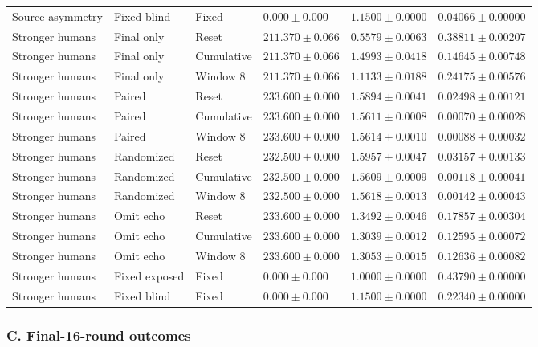 \begin{longtable}{@{}llllll@{}}
Source asymmetry & Fixed blind & Fixed & $0.000 \pm 0.000$ & $1.1500 \pm 0.0000$ & $0.04066 \pm 0.00000$ \\
Stronger humans & Final only & Reset & $211.370 \pm 0.066$ & $0.5579 \pm 0.0063$ & $0.38811 \pm 0.00207$ \\
Stronger humans & Final only & Cumulative & $211.370 \pm 0.066$ & $1.4993 \pm 0.0418$ & $0.14645 \pm 0.00748$ \\
Stronger humans & Final only & Window 8 & $211.370 \pm 0.066$ & $1.1133 \pm 0.0188$ & $0.24175 \pm 0.00576$ \\
Stronger humans & Paired & Reset & $233.600 \pm 0.000$ & $1.5894 \pm 0.0041$ & $0.02498 \pm 0.00121$ \\
Stronger humans & Paired & Cumulative & $233.600 \pm 0.000$ & $1.5611 \pm 0.0008$ & $0.00070 \pm 0.00028$ \\
Stronger humans & Paired & Window 8 & $233.600 \pm 0.000$ & $1.5614 \pm 0.0010$ & $0.00088 \pm 0.00032$ \\
Stronger humans & Randomized & Reset & $232.500 \pm 0.000$ & $1.5957 \pm 0.0047$ & $0.03157 \pm 0.00133$ \\
Stronger humans & Randomized & Cumulative & $232.500 \pm 0.000$ & $1.5609 \pm 0.0009$ & $0.00118 \pm 0.00041$ \\
Stronger humans & Randomized & Window 8 & $232.500 \pm 0.000$ & $1.5618 \pm 0.0013$ & $0.00142 \pm 0.00043$ \\
Stronger humans & Omit echo & Reset & $233.600 \pm 0.000$ & $1.3492 \pm 0.0046$ & $0.17857 \pm 0.00304$ \\
Stronger humans & Omit echo & Cumulative & $233.600 \pm 0.000$ & $1.3039 \pm 0.0012$ & $0.12595 \pm 0.00072$ \\
Stronger humans & Omit echo & Window 8 & $233.600 \pm 0.000$ & $1.3053 \pm 0.0015$ & $0.12636 \pm 0.00082$ \\
Stronger humans & Fixed exposed & Fixed & $0.000 \pm 0.000$ & $1.0000 \pm 0.0000$ & $0.43790 \pm 0.00000$ \\
Stronger humans & Fixed blind & Fixed & $0.000 \pm 0.000$ & $1.1500 \pm 0.0000$ & $0.22340 \pm 0.00000$ \\
\end{longtable}\endgroup
\subsubsection*{C. Final-16-round outcomes}
\begingroup\footnotesize\setlength{\tabcolsep}{4pt}

